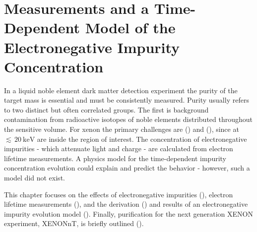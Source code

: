 

\pagestyle{cu}
\graphicspath{{./Chapter5/Figures/}}
\chapter[Measurements and a Time-Dependent Model of the Electronegative Impurity Concentration][Measurements and a Time-Dependent Model of the Electronegative Impurity Concentration]{Measurements and a Time-Dependent Model of the Electronegative Impurity Concentration}
\label{chap:purification}

In a liquid noble element dark matter detection experiment the purity of the target mass is essential and must be
consistently measured.  Purity usually refers to two distinct but often correlated groups.  The first is background contamination from
radioactive isotopes of noble elements distributed throughout the sensitive volume.  For xenon
the primary challenges are  () and 
(), since \betadecays at ${\lesssim}\, 20\ \mathrm{keV}$ are inside the region of
interest.  The concentration of electronegative impurities - which attenuate light and charge - are calculated from electron
lifetime measurements.  A physics model for the time-dependent impurity concentration evolution could explain and
predict the behavior - however, such a model did not exist.

This chapter focuses on the effects of electronegative impurities (), electron lifetime measurements
(), and the derivation () and results of an electronegative
impurity evolution model ().  Finally, purification for the next generation XENON experiment, XENONnT, is briefly
outlined ().



